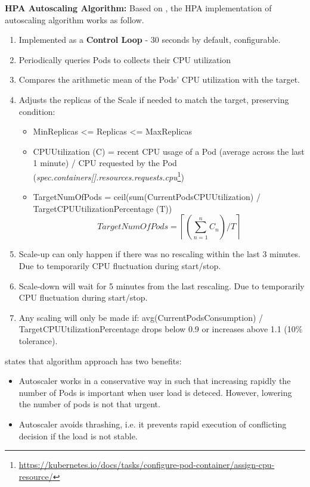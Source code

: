 \newpage

\noindent \textbf{HPA Autoscaling Algorithm:} \quad Based on \parencite{kubeDoc}, the HPA implementation of autoscaling algorithm works as follow.

\begin{enumerate}
\item Implemented as a \textbf{Control Loop} - 30 seconds by default, configurable.
\item Periodically queries Pods to collects their CPU utilization
\item Compares the arithmetic mean of the Pods' CPU utilization with the target.
\item Adjusts the replicas of the Scale if needed to match the target, preserving condition: 
	\begin{itemize}
	\item MinReplicas <= Replicas <= MaxReplicas
	\item CPUUtilization (C) = recent CPU usage of a Pod (average across the last 1 minute)  / CPU requested by the Pod (\textit{spec.containers[].resources.requests.cpu}\footnote{\url{https://kubernetes.io/docs/tasks/configure-pod-container/assign-cpu-resource/}})
	\item TargetNumOfPods = ceil(sum(CurrentPodsCPUUtilization) / TargetCPUUtilizationPercentage (T))
	\[ TargetNumOfPods = \left \lceil \left ( \sum_{n=1}^{n} C_{n}  \right )  / T  \right \rceil \]
	\end{itemize}

\item Scale-up can only happen if there was no rescaling within the last 3 minutes. Due to temporarily CPU fluctuation during start/stop.
\item Scale-down will wait for 5 minutes from the last rescaling. Due to temporarily CPU fluctuation during start/stop.
\item Any scaling will only be made if: avg(CurrentPodsConsumption) / TargetCPUUtilizationPercentage drops below 0.9 or increases above 1.1 (10\% tolerance).
\end{enumerate}

\noindent \parencite{kubeDoc} states that algorithm approach has two benefits:
\begin{itemize}
\item Autoscaler works in a conservative way in such that increasing rapidly the number of Pods is important when user load is deteced. However, lowering the number of pods is not that urgent.
\item Autoscaler avoids thrashing, i.e. it prevents rapid execution of conflicting decision if the load is not stable.
\end{itemize}


